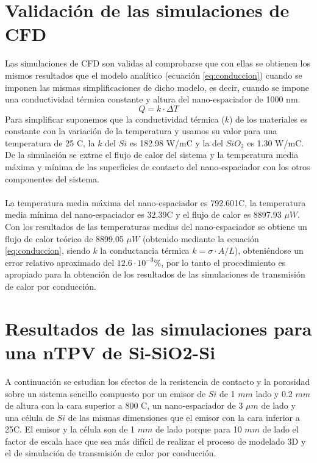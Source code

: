 \section{Validación de las simulaciones de CFD} \label{sec:val_CFD}
Las simulaciones de CFD son validas al comprobarse que con ellas se obtienen los mismos resultados que el modelo analítico (ecuación \eqref{eq:conduccion}) cuando se imponen las mismas simplificaciones de dicho modelo, es decir, cuando se impone una conductividad térmica constante y altura del nano-espaciador de 1000 nm.
\begin{equation}
Q=k\cdot \Delta T
\label{eq:conduccion}
\end{equation}
Para simplificar suponemos que la conductividad térmica ($k$) de los materiales es constante con la variación de la temperatura y usamos su valor para una temperatura de 25 \textdegree C, la $k$ del $Si$ es 182.98 W/m\textdegree C y la del $SiO_2$ es 1.30 W/m\textdegree C. De la simulación se extrae el flujo de calor del sistema y la temperatura media máxima y mínima de las superficies de contacto del nano-espaciador con los otros componentes del sistema.\\\\
La temperatura media máxima del nano-espaciador es 792.601\textdegree C, la temperatura media mínima del nano-espaciador es 32.39\textdegree C y el flujo de calor es 8897.93 $\mu W$. Con los resultados de las temperaturas medias del nano-espaciador se obtiene un flujo de calor teórico de 8899.05 $\mu W$ (obtenido mediante la ecuación \eqref{eq:conduccion}, siendo $k$ la conductancia térmica $k=\sigma \cdot A/L$), obteniéndose un error relativo aproximado del $12.6\cdot 10^{-3}$\%, por lo tanto el procedimiento es apropiado para la obtención de los resultados de las simulaciones de transmisión de calor por conducción.
\section{Resultados de las simulaciones para una nTPV de Si-SiO2-Si}\label{sec:res_SiSiO2Si}
A continuación se estudian los efectos de la resistencia de contacto y la porosidad sobre un sistema sencillo compuesto por un emisor de $Si$ de 1 $mm$ lado y 0.2 $mm$ de altura con la cara superior a 800 \textdegree C, un nano-espaciador de 3 $\mu m$ de lado y una célula de $Si$ de las mismas dimensiones que el emisor con la cara inferior a 25\textdegree C. El emisor y la célula son de 1 $mm$ de lado porque para 10 $mm$ de lado el factor de escala hace que sea más difícil de realizar el proceso de modelado 3D y el de simulación de transmisión de calor por conducción.
